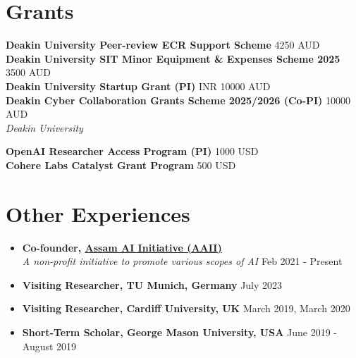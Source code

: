 \documentclass[margin, centered]{res}
\begin{document}
\begin{resume}
\section{Grants}
\textbf{Deakin University Peer-review ECR Support Scheme} \hfill 4250 AUD  \\
\textbf{Deakin University SIT Minor Equipment \& Expenses Scheme 2025} \hfill 3500 AUD  \\
\textbf{Deakin University Startup Grant (PI)} \hfill INR 10000 AUD  \\
\textbf{Deakin Cyber Collaboration Grants Scheme 2025/2026 (Co-PI)} \hfill 10000 AUD  \\
\emph{Deakin University} 

\textbf{OpenAI Researcher Access Program (PI)} \hfill 1000 USD  \\
\textbf{Cohere Labs Catalyst Grant Program} \hfill 500 USD 

\section{Other Experiences}
\begin{itemize}[leftmargin=*]
\item[] \textbf{Co-founder,  \href{https://aaii-axom.github.io/}{Assam AI Initiative (AAII)}} \\
\emph{A non-profit initiative to promote various scopes of AI} \hfill Feb 2021 - Present
\item[] \textbf{Visiting Researcher, TU Munich, Germany} \hfill July 2023
\item[] \textbf{Visiting Researcher, Cardiff University, UK} \hfill March 2019,  March 2020
\item[] \textbf{Short-Term Scholar, George Mason University, USA} \hfill June 2019 - August 2019
\end{itemize}


\end{resume}
\end{document}
